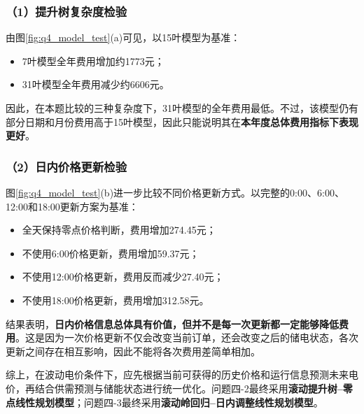 \subsubsection*{（1）提升树复杂度检验}

由图\ref{fig:q4_model_test}(a)可见，以15叶模型为基准：

\begin{itemize}
    \item 7叶模型全年费用增加约1773元；
    \item 31叶模型全年费用减少约6606元。
\end{itemize}

因此，在本题比较的三种复杂度下，31叶模型的全年费用最低。不过，该模型仍有部分日期和月份费用高于15叶模型，因此只能说明其在\textbf{本年度总体费用指标下表现更好}。

\subsubsection*{（2）日内价格更新检验}

图\ref{fig:q4_model_test}(b)进一步比较不同价格更新方式。以完整的0:00、6:00、12:00和18:00更新方案为基准：

\begin{itemize}
    \item 全天保持零点价格判断，费用增加274.45元；
    \item 不使用6:00价格更新，费用增加59.37元；
    \item 不使用12:00价格更新，费用反而减少27.40元；
    \item 不使用18:00价格更新，费用增加312.58元。
\end{itemize}

结果表明，\textbf{日内价格信息总体具有价值，但并不是每一次更新都一定能够降低费用}。这是因为一次价格更新不仅会改变当前订单，还会改变之后的储电状态，各次更新之间存在相互影响，因此不能将各次费用差简单相加。

综上，在波动电价条件下，应先根据当前可获得的历史价格和运行信息预测未来电价，再结合供需预测与储能状态进行统一优化。问题四-2最终采用\textbf{滚动提升树--零点线性规划模型}；问题四-3最终采用\textbf{滚动岭回归--日内调整线性规划模型}。